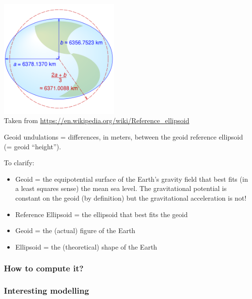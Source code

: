 \begin{center}
\includegraphics[width=6cm]{images/geoid/ellipsoid_wgs84}\\
Taken from \url{https://en.wikipedia.org/wiki/Reference_ellipsoid}
\end{center}


Geoid undulations = differences, in meters, between
the geoid reference ellipsoid
(= geoid ``height'').

To clarify:
\begin{itemize}
\item Geoid = the equipotential surface of the Earth's gravity field that
best fits (in a least squares sense) the mean sea level.
The gravitational potential is constant on the geoid (by definition) but 
the gravitational acceleration is not! 

\item Reference Ellipsoid = the ellipsoid that best fits the geoid 
\item Geoid = the (actual) figure of the Earth 
\item Ellipsoid = the (theoretical) shape of the Earth
\end{itemize}



\subsubsection{How to compute it?}

\subsubsection{Interesting modelling}

